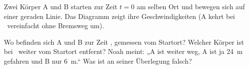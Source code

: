 Zwei Körper A und B starten zur Zeit $t = 0$ am selben Ort und bewegen sich auf einer geraden Linie. Das Diagramm zeigt ihre Geschwindigkeiten (A kehrt bei \tHO\ vereinfacht ohne Bremsweg um).
\begin{center}
\end{center}
\begin{abcliste}
\abc Wo befinden sich A und B zur Zeit \tEO, gemessen vom Startort?
\abc Welcher Körper ist bei \tEO\ weiter vom Startort entfernt?
\abc Noah meint: „A ist weiter weg, A ist ja \SI{24}{\meter} gefahren und B nur \SI{6}{\meter}.“ Was ist an seiner Überlegung falsch?
\end{abcliste}
